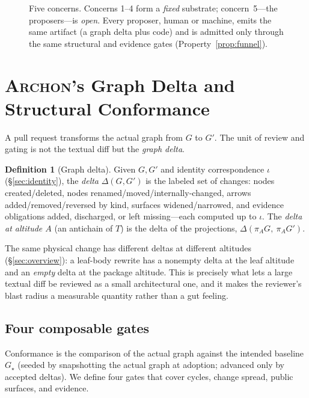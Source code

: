 \documentclass[sigconf,review,anonymous]{acmart}
\theoremstyle{plain}
\theoremstyle{definition}
\newtheorem{definition}[theorem]{Definition}
\begin{document}
\begin{figure}[t]
\centering

\caption{Five concerns. Concerns 1--4 form a \emph{fixed} substrate;
concern~5---the proposers---is \emph{open}. Every proposer, human or machine,
emits the same artifact (a graph delta plus code) and is admitted only through
the same structural and evidence gates (Property~\ref{prop:funnel}).}
\label{fig:substrate}
\end{figure}

\section{\textsc{Archon}'s Graph Delta and Structural Conformance}\label{sec:enforce}

A pull request transforms the actual graph from $G$ to $G'$. The unit of
review and gating is not the textual diff but the \emph{graph delta}.

\begin{definition}[Graph delta]\label{def:delta}
Given $G,G'$ and identity correspondence $\iota$ (\S\ref{sec:identity}), the
\emph{delta} $\Delta(G,G')$ is the labeled set of changes:
nodes created/deleted, nodes renamed/moved/internally-changed, arrows
added/removed/reversed by kind, surfaces widened/narrowed, and evidence
obligations added, discharged, or left missing---each computed up to $\iota$.
The \emph{delta at altitude $A$} (an antichain of $T$) is the delta of the
projections, $\Delta(\pi_A G,\ \pi_A G')$.
\end{definition}

The same physical change has different deltas at different altitudes
(\S\ref{sec:overview}): a leaf-body rewrite has a nonempty delta at the leaf
altitude and an \emph{empty} delta at the package altitude. This is precisely
what lets a large textual diff be reviewed as a small architectural one, and it
makes the reviewer's blast radius a measurable quantity rather than a
gut feeling.

\subsection{Four composable gates}

Conformance is the comparison of the actual graph against the intended baseline
$G_\star$ (seeded by snapshotting the actual graph at adoption; advanced only by
accepted deltas). We define four gates that cover cycles, change spread, public
surfaces, and evidence.
\end{document}
